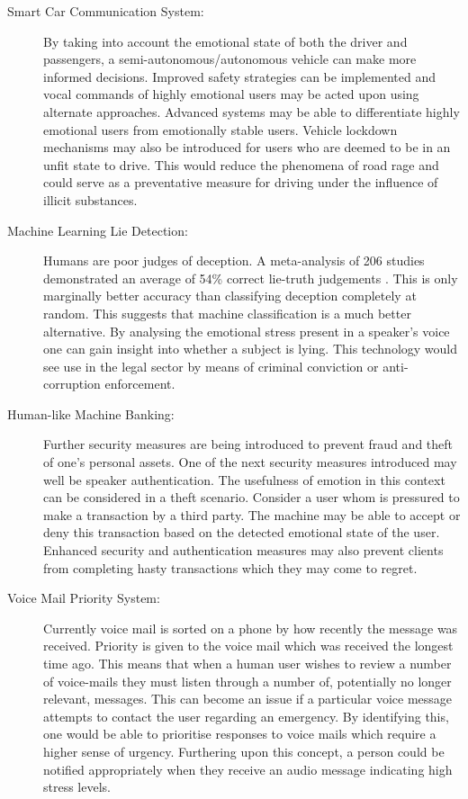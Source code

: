 \begin{description}
\item[Smart Car Communication System\label{carComms}:]
By taking into account the emotional state of both the driver and passengers, a semi-autonomous/autonomous vehicle can make more informed decisions. Improved safety strategies can be implemented and vocal commands of highly emotional users may be acted upon using alternate approaches. Advanced systems may be able to differentiate highly emotional users from emotionally stable users. Vehicle lockdown mechanisms may also be introduced for users who are deemed to be in an unfit state to drive. This would reduce the phenomena of road rage and could serve as a preventative measure for driving under the influence of illicit substances.

\item[Machine Learning Lie Detection\label{LieDect}:]
Humans are poor judges of deception. A meta-analysis of 206 studies demonstrated an average of 54\% correct lie-truth judgements \cite{lyingPsych}. This is only marginally better accuracy than classifying deception completely at random. This suggests that machine classification is a much better alternative. By analysing the emotional stress present in a speaker's voice one can gain insight into whether a subject is lying. This technology would see use in the legal sector by means of criminal conviction or anti-corruption enforcement.

\item[Human-like Machine Banking\label{smartBank}:]
Further security measures are being introduced to prevent fraud and theft of one's personal assets. One of the next security measures introduced may well be speaker authentication. The usefulness of emotion in this context can be considered in a theft scenario. Consider a user whom is pressured to make a transaction by a third party. The machine may be able to accept or deny this transaction based on the detected emotional state of the user. Enhanced security and authentication measures may also prevent clients from completing hasty transactions which they may come to regret.

\item[Voice Mail Priority System\label{voiceMailSys}:]
Currently voice mail is sorted on a phone by how recently the message was received. Priority is given to the voice mail which was received the longest time ago. This means that when a human user wishes to review a number of voice-mails they must listen through a number of, potentially no longer relevant, messages. This can become an issue if a particular voice message attempts to contact the user regarding an emergency. By identifying this, one would be able to prioritise responses to voice mails which require a higher sense of urgency. Furthering upon this concept, a person could be notified appropriately when they receive an audio message indicating high stress levels. 

\end{description}



